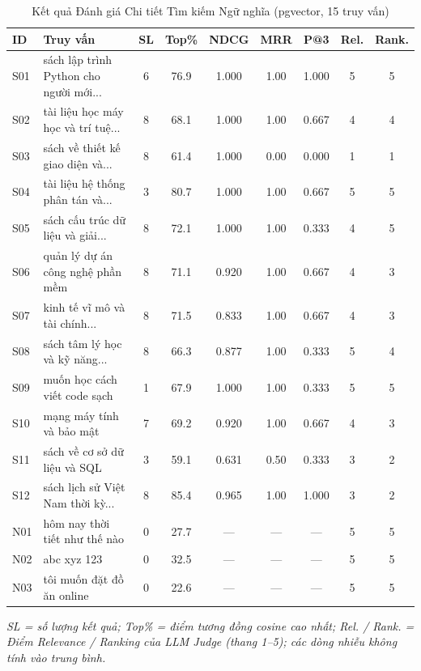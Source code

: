 \begin{table}[H]
\centering
\caption{Kết quả Đánh giá Chi tiết Tìm kiếm Ngữ nghĩa (pgvector, 15 truy vấn)}
\label{tab:search_eval_results}
\begin{tabularx}{\textwidth}{|l|X|c|c|c|c|c|c|c|}
\hline
\textbf{ID} & \textbf{Truy vấn} & \textbf{SL} & \textbf{Top\%} & \textbf{NDCG} & \textbf{MRR} & \textbf{P@3} & \textbf{Rel.} & \textbf{Rank.} \\
\hline
S01 & sách lập trình Python cho người mới... & 6 & 76.9 & 1.000 & 1.00 & 1.000 & 5 & 5 \\
\hline
S02 & tài liệu học máy học và trí tuệ... & 8 & 68.1 & 1.000 & 1.00 & 0.667 & 4 & 4 \\
\hline
S03 & sách về thiết kế giao diện và... & 8 & 61.4 & 1.000 & 0.00 & 0.000 & 1 & 1 \\
\hline
S04 & tài liệu hệ thống phân tán và... & 3 & 80.7 & 1.000 & 1.00 & 0.667 & 5 & 5 \\
\hline
S05 & sách cấu trúc dữ liệu và giải... & 8 & 72.1 & 1.000 & 1.00 & 0.333 & 4 & 5 \\
\hline
S06 & quản lý dự án công nghệ phần mềm & 8 & 71.1 & 0.920 & 1.00 & 0.667 & 4 & 3 \\
\hline
S07 & kinh tế vĩ mô và tài chính... & 8 & 71.5 & 0.833 & 1.00 & 0.667 & 4 & 3 \\
\hline
S08 & sách tâm lý học và kỹ năng... & 8 & 66.3 & 0.877 & 1.00 & 0.333 & 5 & 4 \\
\hline
S09 & muốn học cách viết code sạch & 1 & 67.9 & 1.000 & 1.00 & 0.333 & 5 & 5 \\
\hline
S10 & mạng máy tính và bảo mật & 7 & 69.2 & 0.920 & 1.00 & 0.667 & 4 & 3 \\
\hline
S11 & sách về cơ sở dữ liệu và SQL & 3 & 59.1 & 0.631 & 0.50 & 0.333 & 3 & 2 \\
\hline
S12 & sách lịch sử Việt Nam thời kỳ... & 8 & 85.4 & 0.965 & 1.00 & 1.000 & 3 & 2 \\
\hline
N01 & hôm nay thời tiết như thế nào & 0 & 27.7 & --- & --- & --- & 5 & 5 \\
\hline
N02 & abc xyz 123 & 0 & 32.5 & --- & --- & --- & 5 & 5 \\
\hline
N03 & tôi muốn đặt đồ ăn online & 0 & 22.6 & --- & --- & --- & 5 & 5 \\
\hline
\end{tabularx}
\end{table}

\noindent \textit{SL = số lượng kết quả; Top\% = điểm tương đồng cosine cao nhất; Rel. / Rank. = Điểm Relevance / Ranking của LLM Judge (thang 1--5); các dòng nhiễu không tính vào trung bình.}

